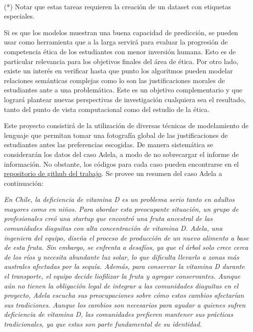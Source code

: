 \documentclass[
	spanish, %
	letterpaper, oneside
]{article}
\begin{document}
\\ (*) Notar que estas tareas requieren la creación de un dataset con etiquetas especiales.

\newp Si es que los modelos muestran una buena capacidad de predicción, se pueden usar como herramienta que a la larga servirá para evaluar la progresión de competencia ética de los estudiantes con menor inversión humana. Esto es de particular relevancia para los objetivos finales del área de ética. Por otro lado, existe un interés en verificar hasta que punto los algoritmos pueden modelar relaciones semánticas complejas como lo son las justificaciones morales de estudiantes ante a una problemática. Este es un objetivo complementario y que logrará plantear nuevas perspectivas de investigación cualquiera sea el resultado, tanto del punto de vista computacional como del estudio de la ética.

\newp Este proyecto consistirá de la utilización de diversas técnicas de modelamiento de lenguaje que permitan tomar una fotografía global de las justificaciones de estudiantes antes las preferencias escogidas.
De manera sistemática se considerarán los datos del caso Adela, a modo de no sobrecargar el informe de información. No obstante, los códigos para cada caso pueden encontrarse en el \href{https://github.com/camilocarvajalreyes/ethics-nlp}{repositorio de github del trabajo}. Se provee un resumen del caso Adela a continuación:

\newp \textit{En Chile, la deficiencia de vitamina D es un problema serio tanto en adultos mayores como en niños. Para abordar esta preocupante situación, un grupo de profesionales creó una startup que encontró una fruta ancestral de las comunidades diaguitas con alta concentración de vitamina D. Adela, una ingeniera del equipo, diseña el proceso de producción de un nuevo alimento a base de esta fruta. Sin embargo, se enfrenta a desafíos, ya que el árbol solo crece cerca de los ríos y necesita abundante luz solar, lo que dificulta llevarlo a zonas más australes afectadas por la sequía. Además, para conservar la vitamina D durante el transporte, el equipo decide liofilizar la fruta y agregar conservantes. Aunque aún no tienen la obligación legal de integrar a las comunidades diaguitas en el proyecto, Adela escucha sus preocupaciones sobre cómo estos cambios afectarían sus tradiciones. Aunque los cambios son necesarios para ayudar a quienes sufren deficiencia de vitamina D, las comunidades prefieren mantener sus prácticas tradicionales, ya que estas son parte fundamental de su identidad.}
\end{document}
